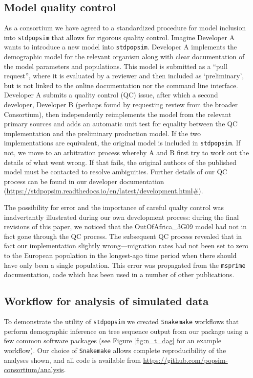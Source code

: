\documentclass[12pt,halfline,a4paper]{ouparticle}
\newcommand{\stdpopsim}{\texttt{stdpopsim}\xspace}
\begin{document}
\subsection*{Model quality control}
As a consortium we have agreed to a standardized procedure for model inclusion
into \stdpopsim that allows for rigorous quality control. Imagine Developer A
wants to introduce a new model into \stdpopsim. Developer A implements the
demographic model for the relevant organism along with clear documentation
of the model parameters and populations. This model is submitted as a ``pull request'',
where it is evaluated by a reviewer and then included as `preliminary',
but is not linked to the online documentation nor the command line interface.
Developer A submits a quality control (QC) issue, after which a second developer,
Developer B (perhaps found by requesting review from the broader Consortium),
then independently reimplements the model from the relevant
primary sources and adds an automatic unit test for equality between the
QC implementation and the preliminary production model.
If the two implementations are equivalent, the original model is included in \stdpopsim.
If not, we move to an arbitration process whereby A and B first try
to work out the details of what went wrong. If that fails, the original
authors of the published model must be contacted
to resolve ambiguities.
Further details of our QC process can be found in our developer documentation
(\url{https://stdpopsim.readthedocs.io/en/latest/development.html#}).

The possibility for error and the importance of careful qualty control
was inadvertantly illustrated during our own development process:
during the final revisions of this paper, we noticed that the
OutOfAfrica\_3G09 model \citep{gutenkunst2009inferring}
had not in fact gone through the QC process.
The subsequent QC process revealed that in fact our implementation
slightly wrong---migration rates had not been set to zero to the European population in the longest-ago time period
when there should have only been a single population.
This error was propagated from the \texttt{msprime} documentation,
code which has been used in a number of other publications.

\subsection*{Workflow for analysis of simulated data}
To demonstrate the utility of \stdpopsim we created \texttt{Snakemake}
workflows \citep{koster2012snakemake} that perform demographic inference on
tree sequence output from our package using a few common software packages (see Figure \ref{fig:n_t_dag} for an example workflow).
Our choice of \texttt{Snakemake} allows complete reproducibility of the
analyses shown, and all code is available from \url{https://github.com/popsim-consortium/analysis}.
\end{document}
